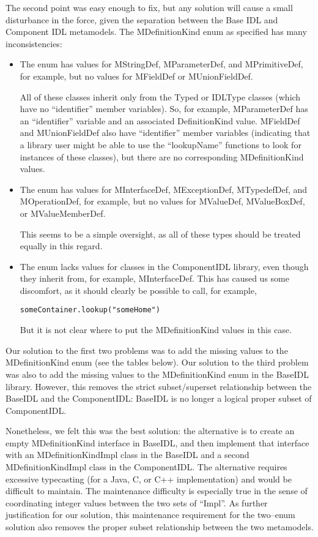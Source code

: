 The second point was easy enough to fix, but any solution will cause a small
disturbance in the force, given the separation between the Base IDL and
Component IDL metamodels. The MDefinitionKind enum as specified has many
inconsistencies:

\begin{itemize}
\item The enum has values for MStringDef, MParameterDef, and MPrimitiveDef, for
      example, but no values for MFieldDef or MUnionFieldDef.

      All of these classes inherit only from the Typed or IDLType classes (which
      have no ``identifier'' member variables). So, for example, MParameterDef
      has an ``identifier'' variable and an associated DefinitionKind value.
      MFieldDef and MUnionFieldDef also have ``identifier'' member variables
      (indicating that a library user might be able to use the ``lookupName''
      functions to look for instances of these classes), but there are no
      corresponding MDefinitionKind values.
\item The enum has values for MInterfaceDef, MExceptionDef, MTypedefDef, and
      MOperationDef, for example, but no values for MValueDef, MValueBoxDef, or
      MValueMemberDef.

      This seems to be a simple oversight, as all of these types should be
      treated equally in this regard.
\item The enum lacks values for classes in the ComponentIDL library, even though
      they inherit from, for example, MInterfaceDef. This has caused us some
      discomfort, as it should clearly be possible to call, for example,
\begin{verbatim}
someContainer.lookup("someHome")
\end{verbatim}
      But it is not clear where to put the MDefinitionKind values in this case.
\end{itemize}

Our solution to the first two problems was to add the missing values to the
MDefinitionKind enum (see the tables below). Our solution to the third problem
was also to add the missing values to the MDefinitionKind enum in the BaseIDL
library. However, this removes the strict subset/superset relationship between
the BaseIDL and the ComponentIDL: BaseIDL is no longer a logical proper subset
of ComponentIDL.

Nonetheless, we felt this was the best solution: the alternative is to create an
empty MDefinitionKind interface in BaseIDL, and then implement that interface
with an MDefinitionKindImpl class in the BaseIDL and a second
MDefinitionKindImpl class in the ComponentIDL. The alternative requires
excessive typecasting (for a Java, C, or C++ implementation) and would be
difficult to maintain. The maintenance difficulty is especially true in the
sense of coordinating integer values between the two sets of ``Impl''. As
further justification for our solution, this maintenance requirement for the
two--enum solution also removes the proper subset relationship between the two
metamodels.

